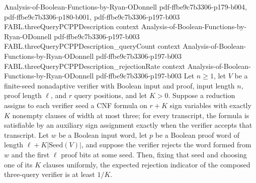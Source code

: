 \begin{theorem}
  {Analysis-of-Boolean-Functions-by-Ryan-ODonnell}
  {pdf-ffbe9c7b3306-p179-b004,
    pdf-ffbe9c7b3306-p180-b001,
    pdf-ffbe9c7b3306-p197-b003}
\proofstep
  {FABL.threeQueryPCPPDescription}
  {context}
  {Analysis-of-Boolean-Functions-by-Ryan-ODonnell}
  {pdf-ffbe9c7b3306-p197-b003}
\proofstep
  {FABL.threeQueryPCPPDescription_queryCount}
  {context}
  {Analysis-of-Boolean-Functions-by-Ryan-ODonnell}
  {pdf-ffbe9c7b3306-p197-b003}
\proofstep
  {FABL.threeQueryPCPPDescription_rejectionRate}
  {context}
  {Analysis-of-Boolean-Functions-by-Ryan-ODonnell}
  {pdf-ffbe9c7b3306-p197-b003}
Let $n\ge1$, let $V$ be a finite-seed nonadaptive verifier with Boolean input and proof,
input length $n$, proof length $\ell$, and $r$ query positions, and let $K>0$. Suppose a
reduction assigns to each verifier seed a CNF formula on $r+K$ sign variables with
exactly $K$ nonempty clauses of width at most three; for every transcript, the formula
is satisfiable by an auxiliary sign assignment exactly when the verifier accepts that
transcript. Let $w$ be a Boolean input word, let $p$ be a Boolean proof word of length
$\ell+K|\mathrm{Seed}(V)|$, and suppose the verifier rejects the word formed from $w$
and the first $\ell$ proof bits at some seed. Then, fixing that seed and choosing one of
its $K$ clauses uniformly, the expected rejection indicator of the composed three-query
verifier is at least $1/K$.
\end{theorem}

